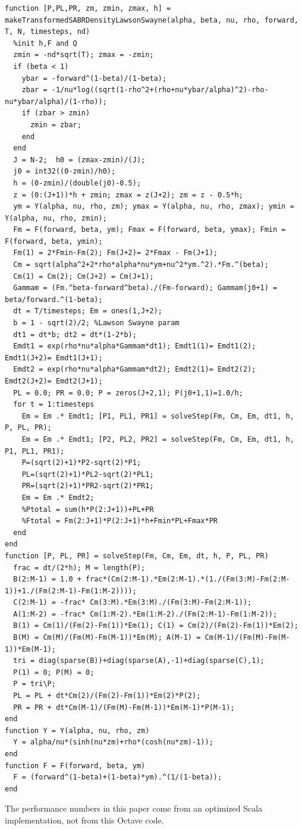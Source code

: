 \documentclass[]{rAMF2e}
\begin{document}
\begin{center}
\begin{lstlisting}
function [P,PL,PR, zm, zmin, zmax, h] = makeTransformedSABRDensityLawsonSwayne(alpha, beta, nu, rho, forward, T, N, timesteps, nd)
  %init h,F and Q
  zmin = -nd*sqrt(T); zmax = -zmin;
  if (beta < 1) 
    ybar = -forward^(1-beta)/(1-beta);
    zbar = -1/nu*log((sqrt(1-rho^2+(rho+nu*ybar/alpha)^2)-rho-nu*ybar/alpha)/(1-rho));
    if (zbar > zmin)
      zmin = zbar;
    end    
  end
  J = N-2;  h0 = (zmax-zmin)/(J);  
  j0 = int32((0-zmin)/h0);
  h = (0-zmin)/(double(j0)-0.5);  
  z = (0:(J+1))*h + zmin; zmax = z(J+2); zm = z - 0.5*h;
  ym = Y(alpha, nu, rho, zm); ymax = Y(alpha, nu, rho, zmax); ymin = Y(alpha, nu, rho, zmin);
  Fm = F(forward, beta, ym); Fmax = F(forward, beta, ymax); Fmin = F(forward, beta, ymin);
  Fm(1) = 2*Fmin-Fm(2); Fm(J+2)= 2*Fmax - Fm(J+1);
  Cm = sqrt(alpha^2+2*rho*alpha*nu*ym+nu^2*ym.^2).*Fm.^(beta);
  Cm(1) = Cm(2); Cm(J+2) = Cm(J+1); 
  Gammam = (Fm.^beta-forward^beta)./(Fm-forward); Gammam(j0+1) = beta/forward.^(1-beta);
  dt = T/timesteps; Em = ones(1,J+2);
  b = 1 - sqrt(2)/2; %Lawson Swayne param
  dt1 = dt*b; dt2 = dt*(1-2*b);
  Emdt1 = exp(rho*nu*alpha*Gammam*dt1); Emdt1(1)= Emdt1(2); Emdt1(J+2)= Emdt1(J+1);
  Emdt2 = exp(rho*nu*alpha*Gammam*dt2); Emdt2(1)= Emdt2(2); Emdt2(J+2)= Emdt2(J+1);
  PL = 0.0; PR = 0.0; P = zeros(J+2,1); P(j0+1,1)=1.0/h;
  for t = 1:timesteps
    Em = Em .* Emdt1; [P1, PL1, PR1] = solveStep(Fm, Cm, Em, dt1, h, P, PL, PR);
    Em = Em .* Emdt1; [P2, PL2, PR2] = solveStep(Fm, Cm, Em, dt1, h, P1, PL1, PR1);
    P=(sqrt(2)+1)*P2-sqrt(2)*P1;
    PL=(sqrt(2)+1)*PL2-sqrt(2)*PL1;
    PR=(sqrt(2)+1)*PR2-sqrt(2)*PR1;
    Em = Em .* Emdt2;
    %Ptotal = sum(h*P(2:J+1))+PL+PR
    %Ftotal = Fm(2:J+1)*P(2:J+1)*h+Fmin*PL+Fmax*PR
  end
end
function [P, PL, PR] = solveStep(Fm, Cm, Em, dt, h, P, PL, PR)
  frac = dt/(2*h); M = length(P);
  B(2:M-1) = 1.0 + frac*(Cm(2:M-1).*Em(2:M-1).*(1./(Fm(3:M)-Fm(2:M-1))+1./(Fm(2:M-1)-Fm(1:M-2))));
  C(2:M-1) = -frac* Cm(3:M).*Em(3:M)./(Fm(3:M)-Fm(2:M-1));
  A(1:M-2) = -frac* Cm(1:M-2).*Em(1:M-2)./(Fm(2:M-1)-Fm(1:M-2));
  B(1) = Cm(1)/(Fm(2)-Fm(1))*Em(1); C(1) = Cm(2)/(Fm(2)-Fm(1))*Em(2);
  B(M) = Cm(M)/(Fm(M)-Fm(M-1))*Em(M); A(M-1) = Cm(M-1)/(Fm(M)-Fm(M-1))*Em(M-1);  
  tri = diag(sparse(B))+diag(sparse(A),-1)+diag(sparse(C),1);
  P(1) = 0; P(M) = 0;
  P = tri\P;
  PL = PL + dt*Cm(2)/(Fm(2)-Fm(1))*Em(2)*P(2);
  PR = PR + dt*Cm(M-1)/(Fm(M)-Fm(M-1))*Em(M-1)*P(M-1);
end
function Y = Y(alpha, nu, rho, zm)
  Y = alpha/nu*(sinh(nu*zm)+rho*(cosh(nu*zm)-1));
end
function F = F(forward, beta, ym)
  F = (forward^(1-beta)+(1-beta)*ym).^(1/(1-beta));
end
\end{lstlisting}
\end{center}
The performance numbers in this paper come from an optimized Scala implementation, not from this Octave code.
\end{document}

